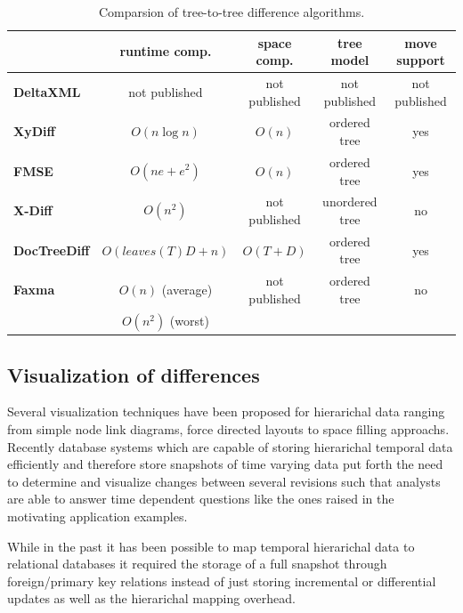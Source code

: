 \begin{table}[tb]
\centering 
\begin{tabular}[r]{|l|c|c|c|c|} 
\hline
& \textbf{runtime comp.} & \textbf{space comp.} & \textbf{tree model} & \textbf{move support}\\
\hline
\hline
\textbf{DeltaXML} & not published & not published & not published & not published\\
\hline
\textbf{XyDiff} & $O(n \log n)$ & $O(n)$ & ordered tree & yes\\
\hline
\textbf{FMSE} & $O(n e + e^2)$ & $O(n)$ & ordered tree & yes\\
\hline
\textbf{X-Diff} & $O(n^2)$ & not published & unordered tree & no\\
\hline
\textbf{DocTreeDiff} & $O(leaves(T)D + n)$ & $O(T+D)$ & ordered tree & yes\\
\hline
\textbf{Faxma} & $O(n)$ (average) & not published & ordered tree & no\\
& $O(n^2)$ (worst) &  & & \\
\hline
\end{tabular}
\label{chap2:comparsion}
\vspace{0.5em} 
\caption{Comparsion of tree-to-tree difference algorithms.}
\end{table}

\subsection{Visualization of differences}
Several visualization techniques have been proposed for hierarichal data ranging from simple node link diagrams, force directed layouts to space filling approachs. Recently database systems which are capable of storing hierarichal temporal data efficiently and therefore store snapshots of time varying data put forth the need to determine and visualize changes between several revisions such that analysts are able to answer time dependent questions like the ones raised in the motivating application examples.

While in the past it has been possible to map temporal hierarichal data to relational databases it required the storage of a full snapshot through foreign/primary key relations instead of just storing incremental or differential updates as well as the hierarichal mapping overhead.

